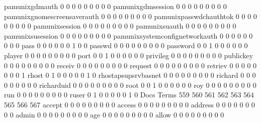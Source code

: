 \documentclass[compress,8pt]{beamer}
\begin{document}
\begin{frame}
\begin{Schunk}
  pamunixgdmauth                             0   0   0   0   0   0   0   0   0
  pamunixgdmsession                          0   0   0   0   0   0   0   0   0
  pamunixgnomescreensaverauth                0   0   0   0   0   0   0   0   0
  pamunixpasswdchauthtok                     0   0   0   0   0   0   0   0   0
  pamunixsession                             0   0   0   0   0   0   0   0   0
  pamunixsuauth                              0   0   0   0   0   0   0   0   0
  pamunixsusession                           0   0   0   0   0   0   0   0   0
  pamunixsystemconfignetworkauth             0   0   0   0   0   0   0   0   0
  pass                                       0   0   0   0   0   0   1   0   0
  passwd                                     0   0   0   0   0   0   0   0   0
  password                                   0   0   1   0   0   0   0   0   0
  player                                     0   0   0   0   0   0   0   0   0
  port                                       0   0   1   0   0   0   0   0   0
  privileg                                   0   0   0   0   0   0   0   0   0
  publickey                                  0   0   0   0   0   0   0   0   0
  receiv                                     0   0   0   0   0   0   0   0   0
  request                                    0   0   0   0   0   0   0   0   0
  retriev                                    0   0   0   0   0   0   0   0   1
  rhost                                      0   1   0   0   0   0   0   1   0
  rhostapsupsrvbasnet                        0   0   0   0   0   0   0   0   0
  richard                                    0   0   0   0   0   0   0   0   0
  richarduid                                 0   0   0   0   0   0   0   0   0
  root                                       0   0   1   0   0   0   0   0   0
  roy                                        0   0   0   0   0   0   0   0   0
  run                                        0   0   0   0   0   0   0   0   0
  ruser                                      0   1   0   0   0   0   0   1   0
                                          Docs
Terms                                      559 560 561 562 563 564 565 566 567
  accept                                     0   0   0   0   0   0   0   0   0
  access                                     0   0   0   0   0   0   0   0   0
  address                                    0   0   0   0   0   0   0   0   0
  admin                                      0   0   0   0   0   0   0   0   0
  age                                        0   0   0   0   0   0   0   0   0
  allow                                      0   0   0   0   0   0   0   0   0

\end{Schunk}
\end{frame}
\end{document}

